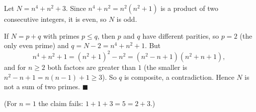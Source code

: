 Let $N=n^4+n^2+3$. Since $n^4+n^2=n^2(n^2+1)$ is a product of two consecutive integers, it is even, so $N$ is odd.

If $N=p+q$ with primes $p\le q$, then $p$ and $q$ have different parities, so $p=2$ (the only even prime) and $q=N-2=n^4+n^2+1$. But
\[
n^4+n^2+1=(n^2+1)^2-n^2=(n^2-n+1)(n^2+n+1),
\]
and for $n\ge2$ both factors are greater than $1$ (the smaller is $n^2-n+1=n(n-1)+1\ge3$). So $q$ is composite, a contradiction. Hence $N$ is not a sum of two primes. $\blacksquare$

(For $n=1$ the claim fails: $1+1+3=5=2+3$.)
